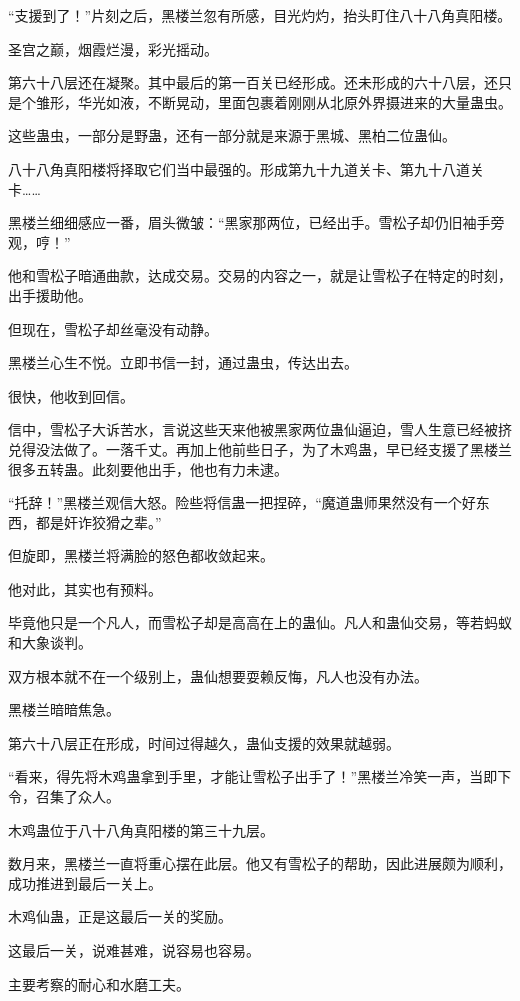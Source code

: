 \begin{this_body}
“支援到了！”片刻之后，黑楼兰忽有所感，目光灼灼，抬头盯住八十八角真阳楼。

圣宫之巅，烟霞烂漫，彩光摇动。

第六十八层还在凝聚。其中最后的第一百关已经形成。还未形成的六十八层，还只是个雏形，华光如液，不断晃动，里面包裹着刚刚从北原外界摄进来的大量蛊虫。

这些蛊虫，一部分是野蛊，还有一部分就是来源于黑城、黑柏二位蛊仙。

八十八角真阳楼将择取它们当中最强的。形成第九十九道关卡、第九十八道关卡……

黑楼兰细细感应一番，眉头微皱：“黑家那两位，已经出手。雪松子却仍旧袖手旁观，哼！”

他和雪松子暗通曲款，达成交易。交易的内容之一，就是让雪松子在特定的时刻，出手援助他。

但现在，雪松子却丝毫没有动静。

黑楼兰心生不悦。立即书信一封，通过蛊虫，传达出去。

很快，他收到回信。

信中，雪松子大诉苦水，言说这些天来他被黑家两位蛊仙逼迫，雪人生意已经被挤兑得没法做了。一落千丈。再加上他前些日子，为了木鸡蛊，早已经支援了黑楼兰很多五转蛊。此刻要他出手，他也有力未逮。

“托辞！”黑楼兰观信大怒。险些将信蛊一把捏碎，“魔道蛊师果然没有一个好东西，都是奸诈狡猾之辈。”

但旋即，黑楼兰将满脸的怒色都收敛起来。

他对此，其实也有预料。

毕竟他只是一个凡人，而雪松子却是高高在上的蛊仙。凡人和蛊仙交易，等若蚂蚁和大象谈判。

双方根本就不在一个级别上，蛊仙想要耍赖反悔，凡人也没有办法。

黑楼兰暗暗焦急。

第六十八层正在形成，时间过得越久，蛊仙支援的效果就越弱。

“看来，得先将木鸡蛊拿到手里，才能让雪松子出手了！”黑楼兰冷笑一声，当即下令，召集了众人。

木鸡蛊位于八十八角真阳楼的第三十九层。

数月来，黑楼兰一直将重心摆在此层。他又有雪松子的帮助，因此进展颇为顺利，成功推进到最后一关上。

木鸡仙蛊，正是这最后一关的奖励。

这最后一关，说难甚难，说容易也容易。

主要考察的耐心和水磨工夫。


\end{this_body}
